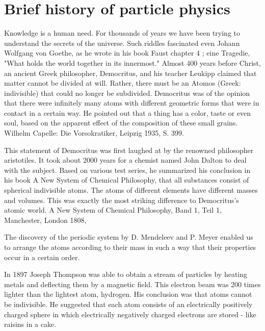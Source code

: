 \section{Brief history of particle physics}
Knowledge is a human need. For thousands of years we have been trying to understand the secrets of the universe. Such riddles fascinated even Johann Wolfgang von Goethe, as he wrote in his book Faust chapter 4 ; eine Tragedie, "What holds the world together in its innermost." 
Almost 400 years before Christ, an ancient Greek philosopher, Democritus, and his teacher Leukipp claimed that matter cannot be divided at will. Rather, there must be an Atomos (Greek: indivisible) that could no longer be subdivided.
Democritus was of the opinion that there were infinitely many atoms with different geometric forms that were in contact in a certain way. He pointed out that a thing has a color, taste or even soul, based on the apparent effect of the composition of these small grains.
Wilhelm Capelle: Die Vorsokratiker, Leipzig 1935, S. 399.

This statement of Democritus was first laughed at by the renowned philosopher aristotiles. It took about 2000 years for a chemist named John Dalton to deal with the subject. Based on various test series, he summarized his conclusion in his book A New System of Chemical Philosophy, that all substances consist of spherical indivisible atoms. The atoms of different elements have different masses and volumes. This was exactly the most striking difference to Democritus's atomic world.
A New System of Chemical Philosophy, Band 1, Teil 1, Manchester, London 1808,

The discovery of the periodic system by D. Mendeleev and P. Meyer enabled us to arrange the atoms according to their mass in such a way that their properties occur in a certain order.

In 1897 Joseph Thompson was able to obtain a stream of particles by heating metals and deflecting them by a magnetic field. This electron beam was 200 times lighter than the lightest atom, hydrogen.
His conclusion was that atoms cannot be indivisible. He suggested that each atom consists of an electrically positively charged sphere in which electrically negatively charged electrons are stored - like raisins in a cake.

